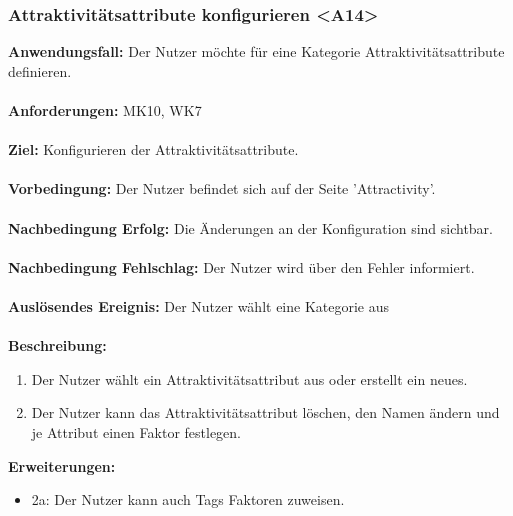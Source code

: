 \documentclass[parskip=full]{scrartcl} %
\begin{document}
\subsubsection*{Attraktivitätsattribute konfigurieren <A14>}
\textbf{Anwendungsfall:} Der Nutzer möchte für eine Kategorie Attraktivitätsattribute definieren.\\\\
\textbf{Anforderungen:} MK10, WK7\\\\
\textbf{Ziel:} Konfigurieren der Attraktivitätsattribute. \\\\
\textbf{Vorbedingung:} Der Nutzer befindet sich auf der Seite 'Attractivity'. \\\\
\textbf{Nachbedingung Erfolg:} Die Änderungen an der Konfiguration sind sichtbar. \\\\
\textbf{Nachbedingung Fehlschlag:} Der Nutzer wird über den Fehler informiert. \\\\
\textbf{Auslösendes Ereignis:} Der Nutzer wählt eine Kategorie aus \\\\
\textbf{Beschreibung:}
\begin{enumerate}
    \item Der Nutzer wählt ein Attraktivitätsattribut aus oder erstellt ein neues.
    \item Der Nutzer kann das Attraktivitätsattribut löschen, den Namen ändern und je Attribut einen Faktor festlegen.
\end{enumerate}
\textbf{Erweiterungen:} 
\begin{itemize}
    \item 2a: Der Nutzer kann auch Tags Faktoren zuweisen.
\end{itemize}
\newpage
\end{document}
